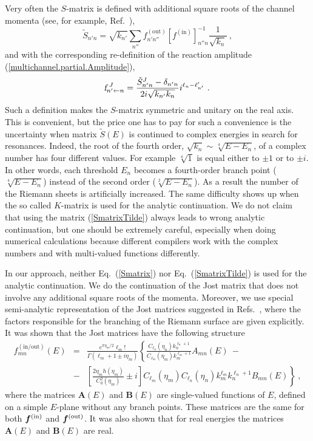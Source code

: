 \documentclass[12pt]{article}
\begin{document}
Very often the $S$-matrix is defined with additional square
roots of the channel momenta (see, for example, Ref.~\cite{Taylor}),
\begin{equation}
\label{SmatrixTilde}
   \tilde{S}_{n'n}=\sqrt{k_{n'}}\sum_{n''}f^{\mathrm{(out)}}_{n'n''}
   \left[f^{\mathrm{(in)}}\right]^{-1}_{n''n}\frac{1}{\sqrt{k_n}}\ ,
\end{equation}
and with the corresponding re-definition of the reaction amplitude
(\ref{multichannel.partial.Amplitude}),
\begin{equation}
\label{Amplitude_tilde}
   {\mbox{\!{\sl f}}}^{\,\,J}_{n'\gets n}=
   \frac{\tilde{S}^J_{n'n}-\delta_{n'n}}
   {2i\sqrt{k_{n'}k_n}}i^{\ell_n-\ell'_{n'}}\ .
\end{equation}
Such a definition makes the $S$-matrix symmetric and unitary on the real axis.
This is convenient, but the price one has to pay for such a convenience is the
uncertainty when matrix $\tilde{S}(E)$ is continued to complex energies in
search for resonances. Indeed, the root of the fourth order,
$\sqrt{k_n}\sim\sqrt[4]{E-E_n}$, of a complex number has four different values.
For example $\sqrt[4]{1}$ is equal either to $\pm1$ or to $\pm i$.
In other words, each threshold $E_n$ becomes a fourth-order
branch point ($\sqrt[4]{E-E_n}$) instead of the second order
($\sqrt[2]{E-E_n}$). As a result the number of the Riemann sheets is
artificially increased. The
same difficulty shows up when the so called $K$-matrix is used for the analytic
continuation. We do not claim that using the matrix (\ref{SmatrixTilde}) always
leads to wrong analytic continuation, but one should be extremely careful,
especially when doing numerical calculations because different compilers work
with the complex numbers and with multi-valued functions differently.

In our approach, neither Eq.~(\ref{Smatrix}) nor Eq.~(\ref{SmatrixTilde}) is
used for the analytic continuation. We do the continuation of the Jost matrix
that does not involve any additional square roots of the momenta.
Moreover, we use special semi-analytic representation of the Jost
matrices suggested in Refs.~\cite{our.MultiCh, our_Coulomb}, where the factors
responsible for the branching of the Riemann surface are given explicitly.
It was shown\cite{our_Coulomb} that the Jost matrices have the
following structure
\begin{eqnarray}
\label{multi.matrixelements}
   f^{(\mathrm{in/out})}_{mn}(E) &=&
   \frac{e^{\pi\eta_m/2}\ell_m!}{\Gamma(\ell_m+1\pm i\eta_m)}
   \left\{
   \frac{{C}_{\ell_n}(\eta_n)k_n^{\ell_n+1}}
   {{C}_{\ell_m}(\eta_m)k_m^{\ell_m+1}}{A}_{mn}(E)\ -\right.\\[3mm]
\nonumber
   &-&
   \left.\left[
   \frac{2\eta_mh(\eta_m)}{C_0^2(\eta_m)}\pm i\right]
   {C}_{\ell_m}(\eta_m){C}_{\ell_n}(\eta_n)
   k_m^{\ell_m}k_n^{\ell_n+1}{B}_{mn}(E)\right\}\ ,
\end{eqnarray}
where the matrices $\bm{A}(E)$ and $\bm{B}(E)$ are single-valued functions of
$E$, defined on a simple $E$-plane without any branch points. These matrices are
the same for both $\bm{f}^{\rm(in)}$ and $\bm{f}^{\rm(out)}$. It was also shown
that for real energies the matrices $\bm{A}(E)$ and $\bm{B}(E)$ are real.
\end{document}
